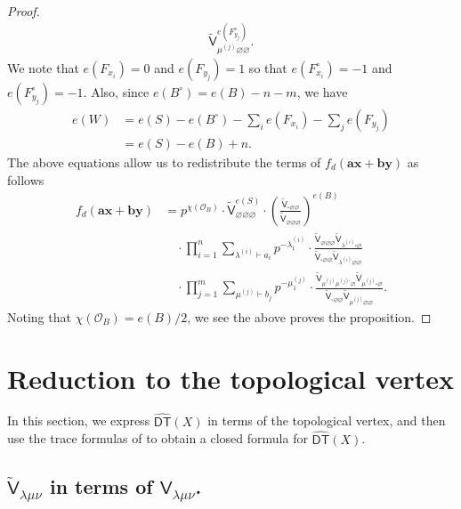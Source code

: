 \documentclass[12pt]{amsart}
\theoremstyle{definition}
\renewcommand{\O}{\mathcal{O}}
\newcommand{\sfV}{\mathsf{V}}
\newcommand{\sfVtilde}{\widetilde{\mathsf{V}}}
\newcommand{\DT}{\mathsf{DT}}
\newcommand{\boldx}{\boldsymbol{x}}
\newcommand{\boldy}{\boldsymbol{y}}
\newcommand{\bolda}{\boldsymbol{a}}
\newcommand{\boldb}{\boldsymbol{b}}
\renewcommand{\emptyset}{\varnothing}
\newcommand{\DThat}{\widehat{\DT}}
\newcommand{\bx}{\square}
\newcommand{\mujprime}{\mu^{(j)\prime}}
\newcommand{\presectionspace}{\vspace{0.2cm}} %
\newcommand{\SubSecSpace}{$\,$\vspace{0.2cm}\par } %
\begin{document}
\begin{proof}
\begin{align*}
\sfVtilde^{e(F^{\circ}_{y_{j}})}_{\mu^{(j)}\emptyset \emptyset}.
\end{align*}
We note that $e(F_{x_{i}})=0$ and $e(F_{y_{j}})=1$ so that
$e(F^{\circ }_{x_{i}})=-1$ and $e(F^{\circ }_{y_{j}})=-1$. Also,
since $e(B^{\circ}) = e(B)-n-m$, we have
\begin{align*}
e(W)&= e(S) - e(B^{\circ}) - \sum_{i} e(F_{x_{i}}) - \sum_{j} e(F_{y_{j}})\\
&= e(S) - e(B) +n.
\end{align*}
The above equations allow us to redistribute the terms of
$f_{d}(\bolda \boldx +\boldb \boldy )$ as follows
\begin{align*}
f_{d}(\bolda \boldx +\boldb \boldy ) &= p^{\chi (\O_{B})} \cdot
\sfVtilde^{e(S)}_{\emptyset \emptyset \emptyset} \cdot
\left(\frac{\sfVtilde_{\bx \emptyset \emptyset}}{\sfVtilde_{\emptyset
\emptyset \emptyset}} \right)^{e(B)} \\
&\quad \cdot \prod_{i=1}^{n} \sum_{\lambda^{(i)} \vdash a_{i}}
p^{-\lambda_{1}^{(i)}} \cdot \frac{\sfVtilde_{\emptyset \emptyset
\emptyset} \sfVtilde_{\lambda^{(i)} \bx  \emptyset}}{\sfVtilde_{\bx
\emptyset \emptyset} \sfVtilde_{\lambda^{(i)}\emptyset \emptyset}} \\
&\quad \cdot \prod_{j=1}^{m} \sum_{\mu^{(j)} \vdash b_{j}}
p^{-\mu_{1}^{(j)}} \cdot \frac{\sfVtilde_{\mu^{(j)} \mujprime
\emptyset} \sfVtilde_{\mu^{(j)} \bx \emptyset}}{\sfVtilde_{\bx
\emptyset \emptyset} \sfVtilde_{\mu^{(j)}\emptyset \emptyset}}.
\end{align*}
Noting that $\chi (\O_{B}) = e(B)/2$, we see the above proves the proposition.
\end{proof}


\presectionspace
\section{Reduction to the topological vertex} \label{sec: reduction to the vertex}

In this section, we express $\DThat (X)$ in terms of the topological
vertex, and then use the trace formulas of \cite{Bryan-Kool-Young} to
obtain a closed formula for $\DThat (X)$.

\subsection{$\sfVtilde_{\lambda \mu \nu}$ in terms of $\sfV_{\lambda
\mu \nu}$.}\SubSecSpace 
\end{document}
